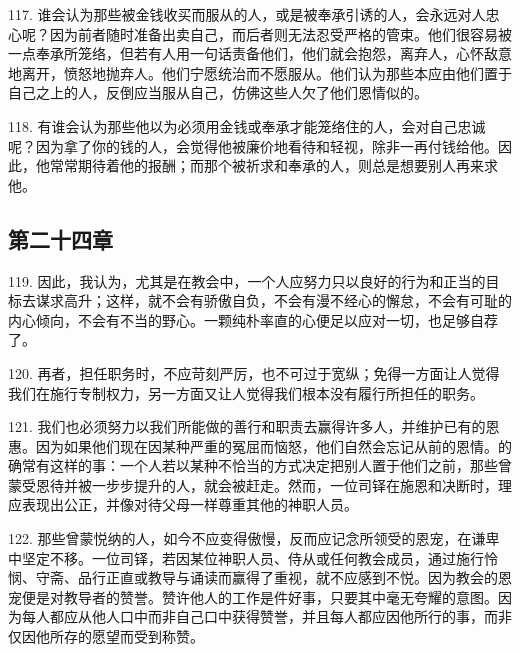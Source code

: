 \par

117. 谁会认为那些被金钱收买而服从的人，或是被奉承引诱的人，会永远对人忠心呢？因为前者随时准备出卖自己，而后者则无法忍受严格的管束。他们很容易被一点奉承所笼络，但若有人用一句话责备他们，他们就会抱怨，离弃人，心怀敌意地离开，愤怒地抛弃人。他们宁愿统治而不愿服从。他们认为那些本应由他们置于自己之上的人，反倒应当服从自己，仿佛这些人欠了他们恩情似的。\par

118. 有谁会认为那些他以为必须用金钱或奉承才能笼络住的人，会对自己忠诚呢？因为拿了你的钱的人，会觉得他被廉价地看待和轻视，除非一再付钱给他。因此，他常常期待着他的报酬；而那个被祈求和奉承的人，则总是想要别人再来求他。\par


\subsection{第二十四章}

\par

119. 因此，我认为，尤其是在教会中，一个人应努力只以良好的行为和正当的目标去谋求高升；这样，就不会有骄傲自负，不会有漫不经心的懈怠，不会有可耻的内心倾向，不会有不当的野心。一颗纯朴率直的心便足以应对一切，也足够自荐了。\par

120. 再者，担任职务时，不应苛刻严厉，也不可过于宽纵；免得一方面让人觉得我们在施行专制权力，另一方面又让人觉得我们根本没有履行所担任的职务。\par

121. 我们也必须努力以我们所能做的善行和职责去赢得许多人，并维护已有的恩惠。因为如果他们现在因某种严重的冤屈而恼怒，他们自然会忘记从前的恩情。的确常有这样的事：一个人若以某种不恰当的方式决定把别人置于他们之前，那些曾蒙受恩待并被一步步提升的人，就会被赶走。然而，一位司铎在施恩和决断时，理应表现出公正，并像对待父母一样尊重其他的神职人员。\par

122. 那些曾蒙悦纳的人，如今不应变得傲慢，反而应记念所领受的恩宠，在谦卑中坚定不移。一位司铎，若因某位神职人员、侍从或任何教会成员，通过施行怜悯、守斋、品行正直或教导与诵读而赢得了重视，就不应感到不悦。因为教会的恩宠便是对教导者的赞誉。赞许他人的工作是件好事，只要其中毫无夸耀的意图。因为每人都应从他人口中而非自己口中获得赞誉，并且每人都应因他所行的事，而非仅因他所存的愿望而受到称赞。\par


